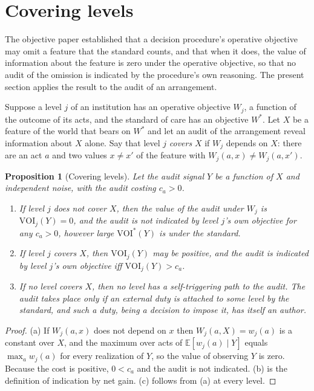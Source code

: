 \documentclass[11pt]{article}
\newcommand{\E}{\mathbb E}
\newcommand{\VOI}{\mathrm{VOI}}
\theoremstyle{plain}
\newtheorem{proposition}{Proposition}
\theoremstyle{definition}
\begin{document}
\section{Covering levels}\label{sec:cover}

The objective paper \cite{flyxion2026objective} established that a decision procedure's operative objective may omit a feature that the standard counts, and that when it does, the value of information about the feature is zero under the operative objective, so that no audit of the omission is indicated by the procedure's own reasoning. The present section applies the result to the audit of an arrangement.

Suppose a level $j$ of an institution has an operative objective $W_j$, a function of the outcome of its acts, and the standard of care has an objective $W^*$. Let $X$ be a feature of the world that bears on $W^*$ and let an audit of the arrangement reveal information about $X$ alone. Say that level $j$ \emph{covers} $X$ if $W_j$ depends on $X$: there are an act $a$ and two values $x\neq x'$ of the feature with $W_j(a,x)\neq W_j(a,x')$.

\begin{proposition}[Covering levels]\label{prop:cover}
Let the audit signal $Y$ be a function of $X$ and independent noise, with the audit costing $c_a>0$. 
\begin{enumerate}[label=(\alph*),nosep]
\item If level $j$ does not cover $X$, then the value of the audit under $W_j$ is $\VOI_j(Y)=0$, and the audit is not indicated by level $j$'s own objective for any $c_a>0$, however large $\VOI^*(Y)$ is under the standard.
\item If level $j$ covers $X$, then $\VOI_j(Y)$ may be positive, and the audit is indicated by level $j$'s own objective iff $\VOI_j(Y)>c_a$.
\item If no level covers $X$, then no level has a self-triggering path to the audit. The audit takes place only if an external duty is attached to some level by the standard, and such a duty, being a decision to impose it, has itself an author.
\end{enumerate}
\end{proposition}

\begin{proof}
(a) If $W_j(a,x)$ does not depend on $x$ then $W_j(a,X)=w_j(a)$ is a constant over $X$, and the maximum over acts of $\E[w_j(a)\mid Y]$ equals $\max_a w_j(a)$ for every realization of $Y$, so the value of observing $Y$ is zero. Because the cost is positive, $0<c_a$ and the audit is not indicated. (b) is the definition of indication by net gain. (c) follows from (a) at every level.
\end{proof}
\end{document}
